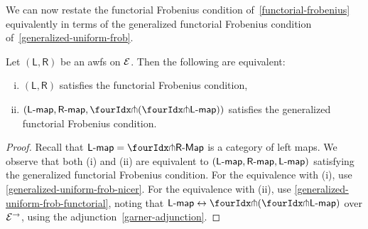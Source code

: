 \documentclass[reqno,10pt,a4paper,oneside,draft]{amsart}
\newcommand{\LL}{\mathsf{L}}
\newcommand{\RR}{\mathsf{R}}
\begin{document}
{{We can now restate the functorial Frobenius condition of~\cref{functorial-frobenius} equivalently in terms of the generalized functorial Frobenius condition of~\cref{generalized-uniform-frob}.

\begin{proposition}
Let $(\mathsf{L}, \mathsf{R})$ be an awfs on $\cal{E}$.
Then the following are equivalent:
\begin{enumerate}[(i)]
\item $(\LL, \RR)$ satisfies the functorial Frobenius condition,
\item $(\pcoalg{\LL}, \palg{\RR}, \liftl{(\liftr{\pcoalg{\LL}})})$ satisfies the generalized functorial Frobenius condition.
\end{enumerate}
\end{proposition}

\begin{proof}
Recall that $\pcoalg{\LL} = \liftl{\pAlg{\RR}}$ is a category of left maps.
We observe that both (i) and (ii) are equivalent to $(\pcoalg{\LL}, \palg{\RR}, \pcoalg{\LL})$ satisfying the generalized functorial Frobenius condition.
For the equivalence with (i), use \cref{generalized-uniform-frob-nicer}.
For the equivalence with (ii), use \cref{generalized-uniform-frob-functorial}, noting that
$\pcoalg{\LL} \leftrightarrow \liftl{(\liftr{\pcoalg{\LL}})}$ over $\cal{E}^\to$, using the adjunction~\eqref{garner-adjunction}.
\end{proof}

}}
\end{document}
